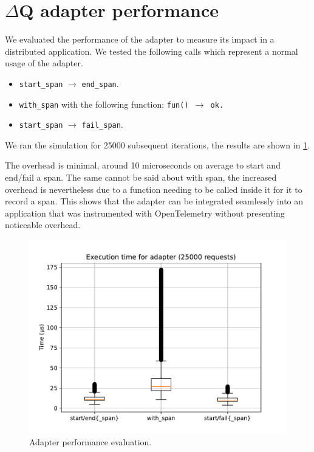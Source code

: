 \section{$\Delta$Q adapter performance}
    We evaluated the performance of the adapter to measure its impact in a distributed application. We tested the following calls which represent a normal usage of the adapter.
    \begin{itemize}
        \item \texttt{start\_span} $\rightarrow$ \texttt{end\_span}.
        \item \texttt{with\_span} with the following function: \texttt{fun() $\rightarrow$ ok.}
        \item \texttt{start\_span} $\rightarrow$ \texttt{fail\_span}.
    \end{itemize}

    We ran the simulation for 25000 subsequent iterations, the results are shown in \cref{fig:stub_perf}. 

    The overhead is minimal, around 10 microseconds on average to start and end/fail a span. The same cannot be said about with span, the increased overhead is nevertheless due to a function needing to be called inside it for it to record a span.  
    This shows that the adapter can be integrated seamlessly into an application that was instrumented with OpenTelemetry without presenting noticeable overhead.

   \begin{figure}[H]
        \begin{center}
            \includegraphics[width=0.7\linewidth]{img/adapter.pdf}
        \end{center}
        \caption{Adapter performance evaluation.}
        \label{fig:stub_perf}
    \end{figure}

